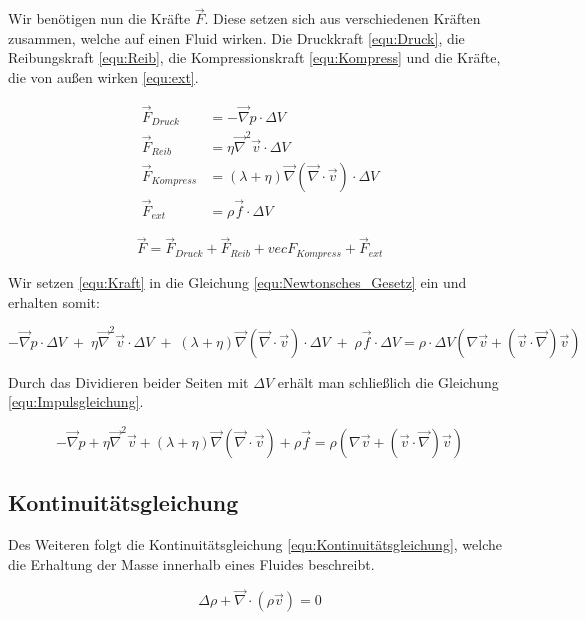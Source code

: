 \documentclass[a4paper, 12pt]{article}
\begin{document}
Wir benötigen nun die Kräfte $\vec{F}$. Diese setzen sich aus verschiedenen Kräften zusammen, welche auf einen Fluid wirken. Die Druckkraft \eqref{equ:Druck}, die Reibungskraft \eqref{equ:Reib}, die Kompressionskraft \eqref{equ:Kompress} und die Kräfte, die von außen wirken \eqref{equ:ext}.

\begin{align}
	\vec{F}_{Druck}    & = - \vec{\nabla}p \cdot \Delta V \label{equ:Druck}                                             \\
	\vec{F}_{Reib}     & = \eta \vec{\nabla}^2 \vec{v} \cdot \Delta V \label{equ:Reib}                                  \\
	\vec{F}_{Kompress} & = (\lambda + \eta)\vec{\nabla}(\vec{\nabla} \cdot \vec{v}) \cdot \Delta V \label{equ:Kompress} \\
	\vec{F}_{ext}      & = \rho \vec{f} \cdot \Delta V \label{equ:ext}
\end{align}

\begin{equation} \label{equ:Kraft}
	\vec{F} = \vec{F}_{Druck} + \vec{F}_{Reib} + vec{F}_{Kompress} + \vec{F}_{ext}
\end{equation}

Wir setzen \eqref{equ:Kraft} in die Gleichung \eqref{equ:Newtonsches_Gesetz} ein und erhalten somit:

\[- \vec{\nabla}p \cdot \Delta V\;+\;\eta \vec{\nabla}^2 \vec{v} \cdot \Delta V\;+\;(\lambda + \eta)\vec{\nabla}(\vec{\nabla} \cdot \vec{v}) \cdot \Delta V\;+\;\rho \vec{f} \cdot \Delta V = \rho \cdot \Delta V (\nabla \vec{v} + (\vec{v} \cdot \vec{\nabla})\vec{v})\]

Durch das Dividieren beider Seiten mit $\Delta V$ erhält man schließlich die Gleichung \eqref{equ:Impulsgleichung}.

\[- \vec{\nabla}p + \eta \vec{\nabla}^2 \vec{v} + (\lambda + \eta)\vec{\nabla}(\vec{\nabla} \cdot \vec{v}) + \rho \vec{f} = \rho (\nabla \vec{v} + (\vec{v} \cdot \vec{\nabla})\vec{v})\]

\subsection{Kontinuitätsgleichung}
Des Weiteren folgt die Kontinuitätsgleichung \eqref{equ:Kontinuitätsgleichung}, welche die Erhaltung der Masse innerhalb eines Fluides beschreibt.

\begin{equation} \label{equ:Kontinuitätsgleichung}
	\Delta \rho + \vec{\nabla} \cdot (\rho \vec{v}) = 0
\end{equation}
\end{document}
